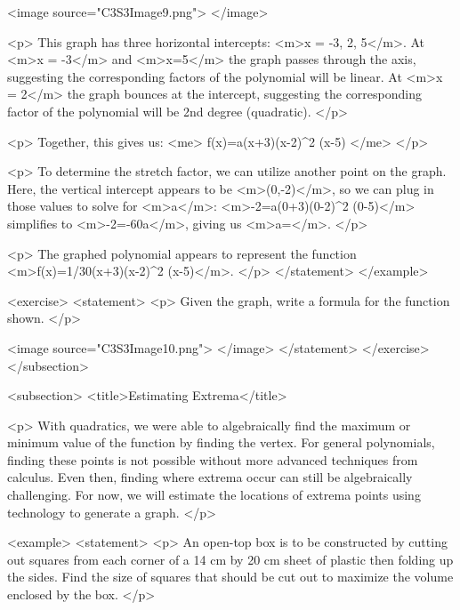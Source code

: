                 <image source="C3S3Image9.png">
                </image>

                <p>
                    This graph has three horizontal intercepts: <m>x = -3, 2, 5</m>.
                    At <m>x = -3</m> and <m>x=5</m> the graph passes through the axis, suggesting the corresponding factors of the polynomial will be linear.
                    At <m>x = 2</m> the graph bounces at the intercept, suggesting the corresponding factor of the polynomial will be 2nd degree (quadratic).
                </p>

                <p>
                    Together, this gives us:
                    <me>
                        f(x)=a(x+3)(x-2)^{2} (x-5)
                    </me>
                </p>

                <p>
                    To determine the stretch factor, we can utilize another point on the graph.
                    Here, the vertical intercept appears to be <m>(0,-2)</m>, so we can plug in those values to solve for <m>a</m>: <m>-2=a(0+3)(0-2)^{2} (0-5)</m> simplifies to <m>-2=-60a</m>, giving us <m>a=</m>.
                </p>

                <p>
                    The graphed polynomial appears to represent the function <m>f(x)=1/30(x+3)(x-2)^{2} (x-5)</m>.
                </p>
            </statement>
        </example>

        <exercise>
            <statement>
                <p>
                    Given the graph, write a formula for the function shown.
                </p>

                <image source="C3S3Image10.png">
                </image>
            </statement>
        </exercise>
    </subsection>


    <subsection>
        <title>Estimating Extrema</title>

        <p>
            With quadratics, we were able to algebraically find the maximum or minimum value of the function by finding the vertex.
            For general polynomials, finding these points is not possible without more advanced techniques from calculus.
            Even then, finding where extrema occur can still be algebraically challenging.
            For now, we will estimate the locations of extrema points using technology to generate a graph.
        </p>

        <example>
            <statement>
                <p>
                    An open-top box is to be constructed by cutting out squares from each corner of a 14 cm by 20 cm sheet of plastic then folding up the sides.
                    Find the size of squares that should be cut out to maximize the volume enclosed by the box.
                </p>

